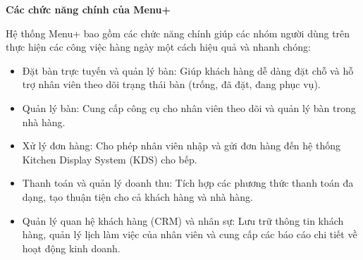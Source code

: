 \textbf{Các chức năng chính của Menu+}

Hệ thống Menu+ bao gồm các chức năng chính giúp các nhóm người dùng trên thực hiện các công việc hàng ngày một cách hiệu quả và nhanh chóng:

\begin{itemize}


    \item Đặt bàn trực tuyến và quản lý bàn: Giúp khách hàng dễ dàng đặt chỗ và hỗ trợ nhân viên theo dõi trạng thái bàn (trống, đã đặt, đang phục vụ).

    \item Quản lý bàn: Cung cấp công cụ cho nhân viên theo dõi và quản lý bàn trong nhà hàng.

    \item Xử lý đơn hàng: Cho phép nhân viên nhập và gửi đơn hàng đến hệ thống Kitchen Display System (KDS) cho bếp.

    \item Thanh toán và quản lý doanh thu: Tích hợp các phương thức thanh toán đa dạng, tạo thuận tiện cho cả khách hàng và nhà hàng.

    \item Quản lý quan hệ khách hàng (CRM) và nhân sự: Lưu trữ thông tin khách hàng, quản lý lịch làm việc của nhân viên và cung cấp các báo cáo chi tiết về hoạt động kinh doanh.
\end{itemize}




% 





